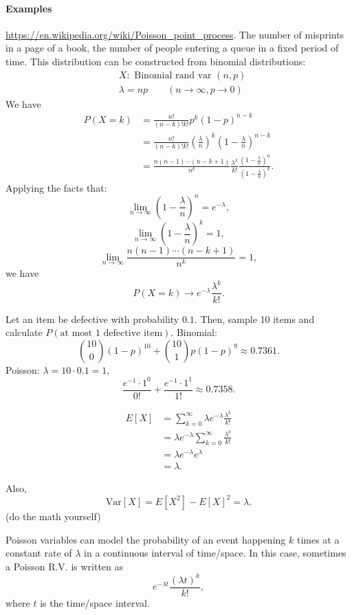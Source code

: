 \documentclass[12pt]{article}
\begin{document}
\paragraph{Examples} \url{https://en.wikipedia.org/wiki/Poisson_point_process}. The number of misprints in a page of a book, the number of people entering a queue in a fixed period of time. This distribution can be constructed from binomial distributions:
\begin{align*}
&X: \text{ Binomial rand var } (n, p)\\
&\lambda = n p \qquad (n\to\infty, p\to 0)
\end{align*}
We have
\begin{align*}
P(X=k)&=\frac{n!}{(n-k)!k!}p^k(1-p)^{n-k}
\\&=\frac{n!}{(n-k)!k!}\left(\frac{\lambda}{n}\right)^k\left(1-\frac{\lambda}{n}\right)^{n-k}\\
&=\frac{n(n-1)\cdots(n-k+1)}{n^k}\frac{\lambda^k}{k!}\frac{\left(1-\frac{\lambda}{n}\right)^n}{\left(1-\frac{\lambda}{n}\right)^k}.
\end{align*}
Applying the facts that:
\[\lim_{n\to\infty}\left(1-\frac{\lambda}{n}\right)^n= e^{-\lambda},\]
\[\lim_{n\to\infty}\left(1-\frac{\lambda}{n}\right)^k=1,\]
\[\lim_{n\to\infty}\frac{n(n-1)\cdots(n-k+1)}{n^k}=1,\]
we have
\[P(X=k)\to e^{-\lambda}\frac{\lambda^k}{k!}.\]

Let an item be defective with probability $0.1.$ Then, sample 10 items and calculate
$P(\text{at most 1 defective item}).$
Binomial:
\[\binom{10}{0}(1-p)^{10}+\binom{10}{1}p(1-p)^9\approx0.7361.\]
Poisson:
$\lambda = 10\cdot 0.1=1,$
\[\frac{e^{-1}\cdot 1^0}{0!}+\frac{e^{-1}\cdot 1^1}{1!}\approx 0.7358.\]

\begin{align*}E[X] &= \sum_{k=0}^\infty \lambda e^{-\lambda}\frac{\lambda^k}{k!}\\
&=\lambda e^{-\lambda}\sum_{k=0}^\infty\frac{\lambda^k}{k!}\\
&=\lambda e^{-\lambda}e^{\lambda}\\
&=\lambda.\end{align*}

Also,
\[\text{Var}[X] = E[X^2]-E[X]^2=\lambda.\]
(do the math yourself)

Poisson variables can model the probability of an event happening $k$ times at a constant rate of $\lambda$ in a continuous interval of time/space. In this case, sometimes a Poisson R.V. is written as
\[e^{-\lambda t}\frac{(\lambda t)^k}{k!},\] where $t$ is the time/space interval.
\end{document}
